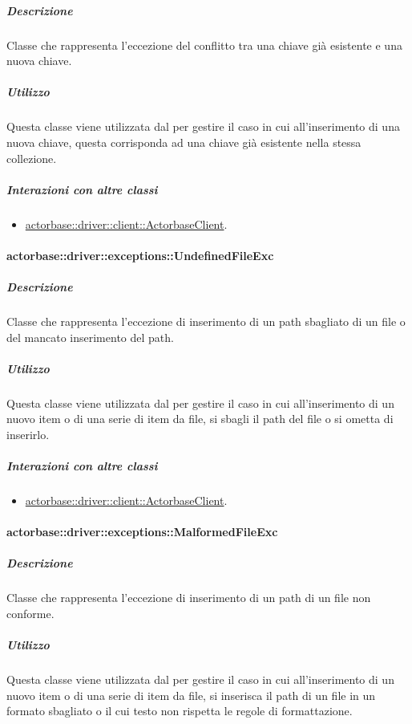 \documentclass{scalatekids-article}
\begin{document}
\subparagraph{Descrizione}

Classe che rappresenta l'eccezione del conflitto tra una chiave già esistente e una nuova chiave.

\subparagraph{Utilizzo}

Questa classe viene utilizzata dal  per gestire il caso in cui all'inserimento di una nuova chiave, questa corrisponda ad una chiave già esistente nella stessa collezione.

\subparagraph{Interazioni con altre classi}

\begin{itemize}
\item \hyperref[sec:actorbase::driver::client::ActorbaseClient]{actorbase::driver::client::ActorbaseClient}.
\end{itemize}

\paragraph{actorbase::driver::exceptions::UndefinedFileExc}

\subparagraph{Descrizione}

Classe che rappresenta l'eccezione di inserimento di un path sbagliato di un file o del mancato inserimento del path.

\subparagraph{Utilizzo}

Questa classe viene utilizzata dal  per gestire il caso in cui all'inserimento di un nuovo item o di una serie di item da file, si sbagli il path del file o si ometta di inserirlo.

\subparagraph{Interazioni con altre classi}

\begin{itemize}
\item \hyperref[sec:actorbase::driver::client::ActorbaseClient]{actorbase::driver::client::ActorbaseClient}.
\end{itemize}

\paragraph{actorbase::driver::exceptions::MalformedFileExc}

\subparagraph{Descrizione}

Classe che rappresenta l'eccezione di inserimento di un path di un file non conforme.

\subparagraph{Utilizzo}

Questa classe viene utilizzata dal  per gestire il caso in cui all'inserimento di un nuovo item o di una serie di item da file, si inserisca il path di un file in un formato sbagliato o il cui testo non rispetta le regole di formattazione.
\end{document}
